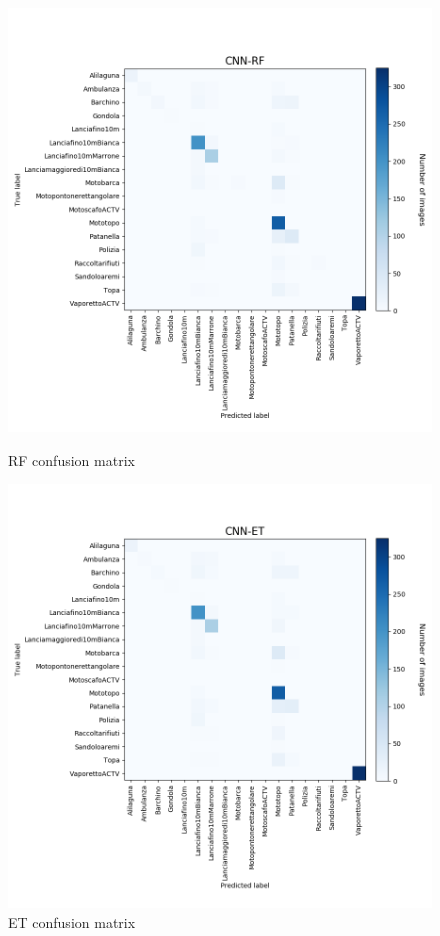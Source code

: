 \documentclass[12pt]{article}
\begin{document}
\begin{figure}[!ht]
	\centering
	\begin{minipage}{.5\textwidth}
		\centering
		\includegraphics[width=.8\linewidth]{../code/output/CNN-RF.png}
		\caption{RF confusion matrix} %
		\label{fig:cnf_rf}
	\end{minipage}%
	\begin{minipage}{.5\textwidth}
		\centering
		\includegraphics[width=.8\linewidth]{../code/output/CNN-ET.png}
		\caption{ET confusion matrix} %
		\label{fig:cnf_et}
	\end{minipage}
\end{figure}
\end{document}
